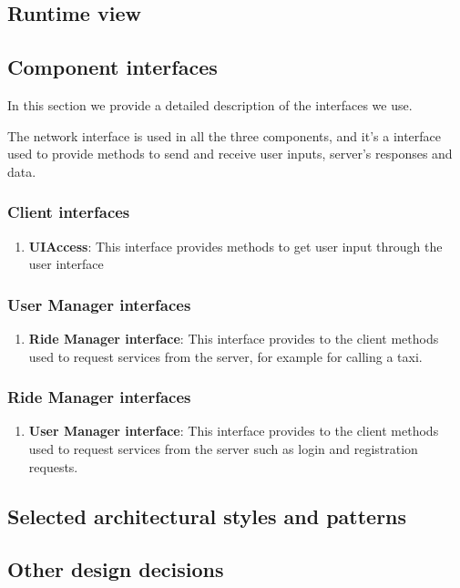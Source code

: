 \subsection{Runtime view}

\subsection{Component interfaces}
In this section we provide a detailed description of the interfaces we use.

The network interface is used in all the three components, and it's a interface used to provide methods to send and receive user inputs, server's responses and data.
\subsubsection{Client interfaces}
\begin{enumerate}
	\item \textbf{UIAccess}: This interface provides methods to get user input through the user interface
\end{enumerate}
\subsubsection{User Manager interfaces}
\begin{enumerate}
	\item \textbf{Ride Manager interface}: This interface provides to the client methods used to request services from the server, for example for calling a taxi.
\end{enumerate}
\subsubsection{Ride Manager interfaces}
	\begin{enumerate}
		\item \textbf{User Manager interface}: This interface provides to the client methods used to request services from the server such as login and registration requests.
	\end{enumerate}
	
\subsection{Selected architectural styles and patterns}

\subsection{Other design decisions}